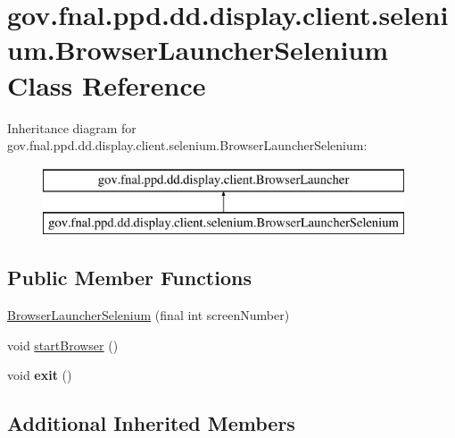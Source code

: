 \hypertarget{classgov_1_1fnal_1_1ppd_1_1dd_1_1display_1_1client_1_1selenium_1_1BrowserLauncherSelenium}{\section{gov.\-fnal.\-ppd.\-dd.\-display.\-client.\-selenium.\-Browser\-Launcher\-Selenium Class Reference}
\label{classgov_1_1fnal_1_1ppd_1_1dd_1_1display_1_1client_1_1selenium_1_1BrowserLauncherSelenium}
}
Inheritance diagram for gov.\-fnal.\-ppd.\-dd.\-display.\-client.\-selenium.\-Browser\-Launcher\-Selenium\-:\begin{figure}[H]
\begin{center}
\leavevmode
\includegraphics[height=2.000000cm]{classgov_1_1fnal_1_1ppd_1_1dd_1_1display_1_1client_1_1selenium_1_1BrowserLauncherSelenium}
\end{center}
\end{figure}
\subsection*{Public Member Functions}
\begin{DoxyCompactItemize}
\item 
\hyperlink{classgov_1_1fnal_1_1ppd_1_1dd_1_1display_1_1client_1_1selenium_1_1BrowserLauncherSelenium_a6dba4c570a0e2fa5d76634651bfcdc4c}{Browser\-Launcher\-Selenium} (final int screen\-Number)
\item 
void \hyperlink{classgov_1_1fnal_1_1ppd_1_1dd_1_1display_1_1client_1_1selenium_1_1BrowserLauncherSelenium_ae5cf136a72446c0de67d0681f6f3f773}{start\-Browser} ()
\item 
\hypertarget{classgov_1_1fnal_1_1ppd_1_1dd_1_1display_1_1client_1_1selenium_1_1BrowserLauncherSelenium_a6cff25c796ef423461240029f69a57ad}{void {\bfseries exit} ()}\label{classgov_1_1fnal_1_1ppd_1_1dd_1_1display_1_1client_1_1selenium_1_1BrowserLauncherSelenium_a6cff25c796ef423461240029f69a57ad}

\end{DoxyCompactItemize}
\subsection*{Additional Inherited Members}


